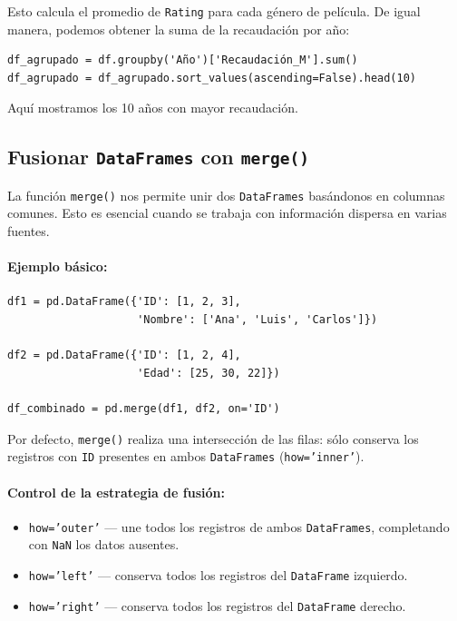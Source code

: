 \documentclass{article}
\theoremstyle{nonumberplain}
\begin{document}
Esto calcula el promedio de \texttt{Rating} para cada género de película. De igual manera, podemos obtener la suma de la recaudación por año:

\begin{verbatim}
df_agrupado = df.groupby('Año')['Recaudación_M'].sum()
df_agrupado = df_agrupado.sort_values(ascending=False).head(10)
\end{verbatim}

Aquí mostramos los 10 años con mayor recaudación.

\subsection*{Fusionar \texttt{DataFrames} con \texttt{merge()}}

La función \texttt{merge()} nos permite unir dos \texttt{DataFrames} basándonos en columnas comunes. Esto es esencial cuando se trabaja con información dispersa en varias fuentes.

\paragraph{Ejemplo básico:}

\begin{verbatim}
df1 = pd.DataFrame({'ID': [1, 2, 3],
                    'Nombre': ['Ana', 'Luis', 'Carlos']})

df2 = pd.DataFrame({'ID': [1, 2, 4],
                    'Edad': [25, 30, 22]})

df_combinado = pd.merge(df1, df2, on='ID')
\end{verbatim}

Por defecto, \texttt{merge()} realiza una intersección de las filas: sólo conserva los registros con \texttt{ID} presentes en ambos \texttt{DataFrames} (\texttt{how='inner'}).

\paragraph{Control de la estrategia de fusión:}

\begin{itemize}
  \item \texttt{how='outer'} — une todos los registros de ambos \texttt{DataFrames}, completando con \texttt{NaN} los datos ausentes.
  \item \texttt{how='left'} — conserva todos los registros del \texttt{DataFrame} izquierdo.
  \item \texttt{how='right'} — conserva todos los registros del \texttt{DataFrame} derecho.
\end{itemize}
\end{document}
